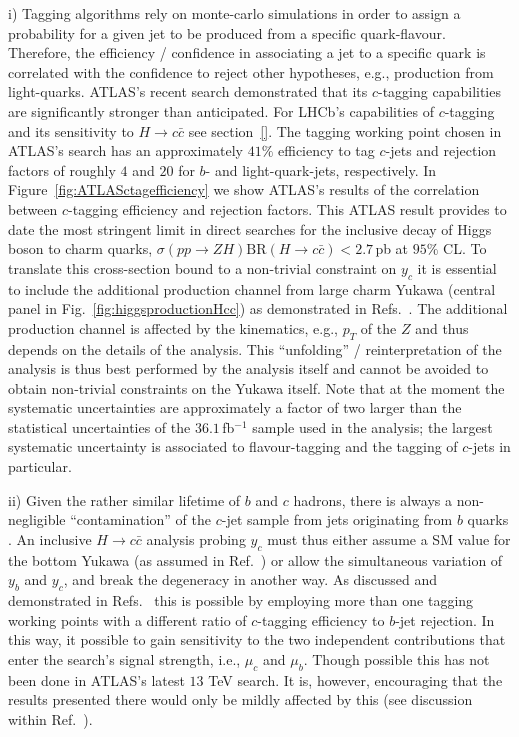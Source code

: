 \documentclass[../report.tex]{subfiles}
\begin{document}
{i)} Tagging algorithms rely on monte-carlo simulations in order to assign a probability 
for a given jet to be produced from a specific quark-flavour. 
Therefore, the efficiency / confidence in associating a jet to a specific quark is 
correlated with the confidence to reject other hypotheses, e.g., production from light-quarks.
ATLAS's recent search \cite{Aaboud:2018fhh} demonstrated that its 
$c$-tagging capabilities are significantly stronger than anticipated.
For LHCb's capabilities of $c$-tagging and its sensitivity to 
$H\to c\bar c$ see section~\ref{}.
The tagging working point chosen in ATLAS's search has an approximately $41\%$ efficiency 
to tag $c$-jets and rejection factors of roughly $4$ and $20$ for $b$- and light-quark-jets, respectively.
In Figure~\ref{fig:ATLASctagefficiency} we show ATLAS's results \cite{Aaboud:2018fhh} 
of the correlation between $c$-tagging efficiency and rejection factors.
This ATLAS result provides to date the most stringent limit in direct searches 
for the inclusive decay of Higgs boson to charm quarks, 
$\sigma(pp\to ZH)\text{BR}(H\to c\bar c)<2.7$\,pb at $95\%$ CL.
To translate this cross-section bound to a non-trivial constraint on $y_c$ it is essential 
to include the additional production channel from large charm Yukawa 
(central panel in Fig.~\ref{fig:higgsproductionHcc}) as demonstrated in Refs.~\cite{Perez:2015aoa}.
The additional production channel is affected by the kinematics, e.g., $p_T$ of the 
$Z$ and thus depends on the details of the analysis. 
This ``unfolding'' / reinterpretation of the analysis is thus best performed by 
the analysis itself and cannot be avoided to obtain non-trivial constraints on the Yukawa itself.
Note that at the moment the systematic uncertainties are approximately a factor of two
larger than the statistical uncertainties of the $36.1$\,fb$^{-1}$ sample used in the analysis;
the largest systematic uncertainty is associated to flavour-tagging and the tagging of $c$-jets 
in particular.

{ii)} Given the rather similar lifetime of $b$ and $c$ hadrons, there is always
a non-negligible ``contamination'' of the $c$-jet sample 
from jets originating from $b$ quarks \cite{Perez:2015aoa}.
An inclusive $H\to c\bar c$ analysis probing $y_c$ must thus either assume a SM value 
for the bottom Yukawa (as assumed in Ref.~\cite{Aaboud:2018fhh}) or allow the 
simultaneous variation of $y_b$ and $y_c$, and break the degeneracy in another way.
As discussed and demonstrated in Refs.~\cite{Perez:2015aoa,Perez:2015lra} this is 
possible by employing more than one tagging working points with a different 
ratio of $c$-tagging efficiency to $b$-jet rejection.
In this way, it possible to gain sensitivity to the two independent contributions 
that enter the search's signal strength, i.e., $\mu_c$ and $\mu_b$.
Though possible this has not been done in ATLAS's latest $13$ TeV search.
It is, however, encouraging that the results presented there would only be mildly 
affected by this (see discussion within Ref.~\cite{Aaboud:2018fhh}).
\end{document}
